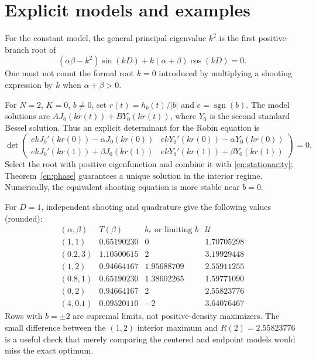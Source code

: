 \documentclass[12pt]{amsart}
\theoremstyle{definition}
\theoremstyle{remark}
\numberwithin{equation}{section}
\begin{document}
\section{Explicit models and examples}
For the constant model, the general principal eigenvalue $k^2$ is the first positive-branch root of
\[
 (\alpha\beta-k^2)\sin(kD)+k(\alpha+\beta)\cos(kD)=0.
\]
One must not count the formal root $k=0$ introduced by multiplying a shooting expression by $k$ when $\alpha+\beta>0$.

For $N=2$, $K=0$, $b\ne0$, set $r(t)=h_b(t)/|b|$ and $e=\operatorname{sgn}(b)$. The model solutions are
$A J_0(kr(t))+B Y_0(kr(t))$, where $Y_0$ is the second standard Bessel solution. Thus an explicit determinant for the Robin equation is
\[
\det\begin{pmatrix}
e kJ_0'(kr(0))-\alpha J_0(kr(0))&e kY_0'(kr(0))-\alpha Y_0(kr(0))\\
e kJ_0'(kr(1))+\beta J_0(kr(1))&e kY_0'(kr(1))+\beta Y_0(kr(1))
\end{pmatrix}=0.
\]
Select the root with positive eigenfunction and combine it with \eqref{en:stationarity}; Theorem~\ref{en:phase} guarantees a unique solution in the interior regime. Numerically, the equivalent shooting equation is more stable near $b=0$.

For $D=1$, independent shooting and quadrature give the following values (rounded):
\[
\begin{array}{c|c|c|c}
 (\alpha,\beta)&T(\beta)&b_*\text{ or limiting }b&\mathcal U\\\hline
 (1,1)&0.65190230&0&1.70705298\\
 (0.2,3)&1.10500615&2&3.19929448\\
 (1,2)&0.94664167&1.95688709&2.55911255\\
 (0.8,1)&0.65190230&1.38602265&1.59771090\\
 (0,2)&0.94664167&2&2.55823776\\
 (4,0.1)&0.09520110&-2&3.64076467
\end{array}
\]
Rows with $b=\pm2$ are supremal limits, not positive-density maximizers. The small difference between the $(1,2)$ interior maximum and $R(2)=2.55823776$ is a useful check that merely comparing the centered and endpoint models would miss the exact optimum.
\end{document}
